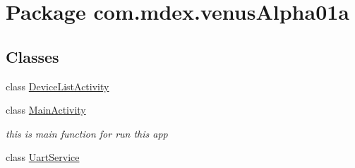 \hypertarget{namespacecom_1_1mdex_1_1venus_alpha01a}{}\section{Package com.\+mdex.\+venus\+Alpha01a}
\label{namespacecom_1_1mdex_1_1venus_alpha01a}
\subsection*{Classes}
\begin{DoxyCompactItemize}
\item 
class \hyperlink{classcom_1_1mdex_1_1venus_alpha01a_1_1_device_list_activity}{Device\+List\+Activity}
\item 
class \hyperlink{classcom_1_1mdex_1_1venus_alpha01a_1_1_main_activity}{Main\+Activity}
\begin{DoxyCompactList}\small\item\em this is main function for run this app \end{DoxyCompactList}\item 
class \hyperlink{classcom_1_1mdex_1_1venus_alpha01a_1_1_uart_service}{Uart\+Service}
\end{DoxyCompactItemize}
